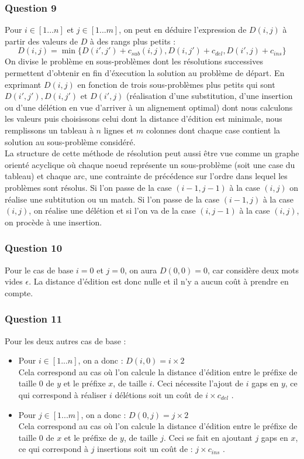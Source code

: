 \documentclass[12pt, a4paper]{report}
\begin{document}
\subsubsection{Question 9}
Pour $i \in \left [1...n\right]$ et $j \in \left[1...m\right]$, on peut en déduire l'expression de $D(i,j)$ à partir des valeurs de $D$ à des rangs plus petits :  
$$D(i,j)=\min\{D(i',j')+c_{sub}(i,j),D(i,j')+c_{del},D(i',j)+c_{ins}\}$$
On divise le problème en sous-problèmes dont les résolutions successives permettent d'obtenir en fin d'éxecution la solution au problème de départ.
En exprimant $D(i,j)$ en fonction de trois sous-problèmes plus petits qui sont $D(i',j'), D(i,j') \text{ et } D(i',j)$ (réalisation d'une substitution, d'une insertion ou d'une délétion en vue d'arriver à un alignement optimal) dont nous calculons les valeurs puis choisissons  celui dont la distance d'édition est minimale, nous remplissons un tableau à $n$ lignes et $m$ colonnes dont chaque case contient la solution au sous-problème considéré.\\
La structure de cette méthode de résolution peut aussi être vue comme un graphe orienté acyclique où chaque noeud représente un sous-problème (soit une case du tableau) et chaque arc, une contrainte de précédence sur l'ordre dans lequel les problèmes sont résolus. Si l'on passe de la case $(i-1,j-1)$ à la case $(i,j)$ on réalise une subtitution ou un match. Si l'on passe de la case $(i-1,j)$ à la case $(i,j)$, on réalise une délétion et si l'on va de la case $(i,j-1)$ à la case $(i,j)$, on procède à une insertion.

\subsubsection{Question 10}
Pour le cas de base $i=0$ et $j=0$, on aura $D(0,0)=0$, car considère deux mots vides $\epsilon$. La distance d'édition est donc nulle et il n'y a aucun coût à prendre en compte.
\subsubsection{Question 11}
Pour les deux autres cas de base :
\begin{itemize}
\item Pour $i \in \left[1...n\right]$, on a donc : $D(i,0)=i\times 2$\\
Cela correspond au cas où l'on calcule la distance d'édition entre le préfixe de taille 0 de $y$ et le préfixe $x$, de taille $i$. Ceci nécessite l'ajout de $i$ gaps en $y$, ce qui correspond à réaliser $i$ délétions soit un coût de $i\times c_{del}$ .
\item Pour $j \in \left[1...m\right]$, on a donc : $D(0,j)=j\times 2$\\
Cela correspond au cas où l'on calcule la distance d'édition entre le préfixe de taille 0 de $x$ et le préfixe de $y$, de taille $j$. Ceci se fait en ajoutant $j$ gaps en $x$, ce qui correspond à $j$ insertions soit un coût de : $j\times c_{ins}$ .
\end{itemize}
\end{document}
